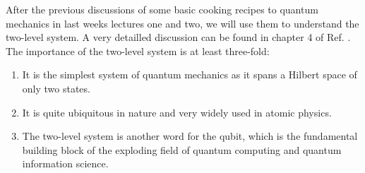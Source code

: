 After the previous discussions of some basic cooking recipes to quantum mechanics in last weeks lectures \href{http://}{}one and two, we will use them to understand the two-level system. A very detailled discussion can be found in chapter 4 of Ref. \cite{1}. The importance of the two-level system is at least three-fold:
\begin{enumerate}
\item It is the simplest system of quantum mechanics as it spans a Hilbert space of only two states.
\item It is quite ubiquitous in nature and very widely used in atomic physics.
\item The two-level system is another word for the qubit, which is the fundamental building block of the exploding field of quantum computing and quantum information science.
\end{enumerate}

